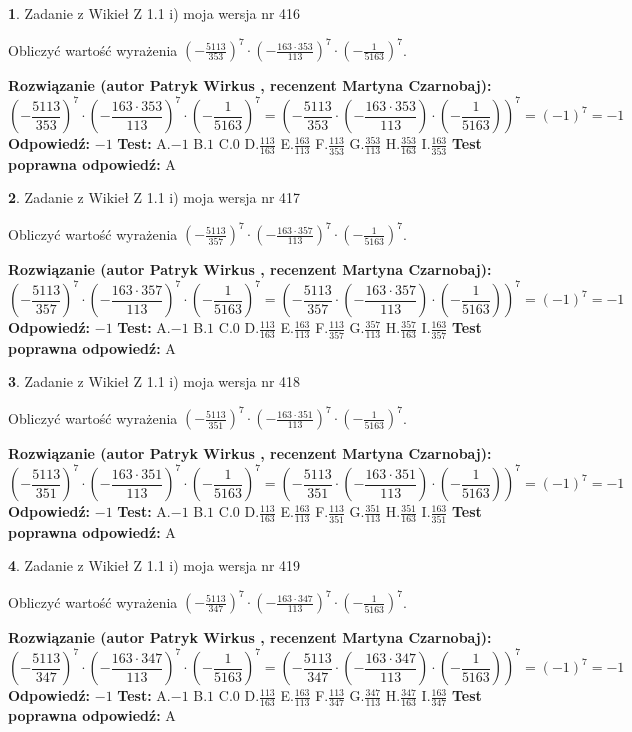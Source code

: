 \documentclass[12pt, a4paper]{article}
\theoremstyle{definition} %
\newtheorem{zad}{}
\newcommand{\zadStart}[1]{\begin{zad}#1\newline}
\newcommand{\zadStop}{\end{zad}}
\newcommand{\rozwStart}[2]{\noindent \textbf{Rozwiązanie (autor #1 , recenzent #2): }\newline}
\newcommand{\rozwStop}{\newline}
\newcommand{\odpStart}{\noindent \textbf{Odpowiedź:}\newline}
\newcommand{\odpStop}{\newline}
\newcommand{\testStart}{\noindent \textbf{Test:}\newline}
\newcommand{\testStop}{\newline}
\newcommand{\kluczStart}{\noindent \textbf{Test poprawna odpowiedź:}\newline}
\newcommand{\kluczStop}{\newline}
\begin{document}
\zadStart{Zadanie z Wikieł Z 1.1 i) moja wersja nr 416}

Obliczyć wartość wyrażenia $(-\frac{5113}{353})^{7} \cdot (-\frac{163 \cdot 353}{113})^{7} \cdot (-\frac{1}{5163})^{7}$.
\zadStop
\rozwStart{Patryk Wirkus}{Martyna Czarnobaj}
$$(-\frac{5113}{353})^{7} \cdot (-\frac{163 \cdot 353}{113})^{7} \cdot (-\frac{1}{5163})^{7} = (-\frac{5113}{353} \cdot (-\frac{163 \cdot 353}{113}) \cdot (-\frac{1}{5163}))^{7} = (-1)^{7} = -1$$
\rozwStop
\odpStart
$-1$
\odpStop
\testStart
A.$-1$ B.$1$ C.$0$ D.$\frac{113}{163}$ E.$\frac{163}{113}$
F.$\frac{113}{353}$ G.$\frac{353}{113}$
H.$\frac{353}{163}$
I.$\frac{163}{353}$
\testStop
\kluczStart
A
\kluczStop



\zadStart{Zadanie z Wikieł Z 1.1 i) moja wersja nr 417}

Obliczyć wartość wyrażenia $(-\frac{5113}{357})^{7} \cdot (-\frac{163 \cdot 357}{113})^{7} \cdot (-\frac{1}{5163})^{7}$.
\zadStop
\rozwStart{Patryk Wirkus}{Martyna Czarnobaj}
$$(-\frac{5113}{357})^{7} \cdot (-\frac{163 \cdot 357}{113})^{7} \cdot (-\frac{1}{5163})^{7} = (-\frac{5113}{357} \cdot (-\frac{163 \cdot 357}{113}) \cdot (-\frac{1}{5163}))^{7} = (-1)^{7} = -1$$
\rozwStop
\odpStart
$-1$
\odpStop
\testStart
A.$-1$ B.$1$ C.$0$ D.$\frac{113}{163}$ E.$\frac{163}{113}$
F.$\frac{113}{357}$ G.$\frac{357}{113}$
H.$\frac{357}{163}$
I.$\frac{163}{357}$
\testStop
\kluczStart
A
\kluczStop



\zadStart{Zadanie z Wikieł Z 1.1 i) moja wersja nr 418}

Obliczyć wartość wyrażenia $(-\frac{5113}{351})^{7} \cdot (-\frac{163 \cdot 351}{113})^{7} \cdot (-\frac{1}{5163})^{7}$.
\zadStop
\rozwStart{Patryk Wirkus}{Martyna Czarnobaj}
$$(-\frac{5113}{351})^{7} \cdot (-\frac{163 \cdot 351}{113})^{7} \cdot (-\frac{1}{5163})^{7} = (-\frac{5113}{351} \cdot (-\frac{163 \cdot 351}{113}) \cdot (-\frac{1}{5163}))^{7} = (-1)^{7} = -1$$
\rozwStop
\odpStart
$-1$
\odpStop
\testStart
A.$-1$ B.$1$ C.$0$ D.$\frac{113}{163}$ E.$\frac{163}{113}$
F.$\frac{113}{351}$ G.$\frac{351}{113}$
H.$\frac{351}{163}$
I.$\frac{163}{351}$
\testStop
\kluczStart
A
\kluczStop



\zadStart{Zadanie z Wikieł Z 1.1 i) moja wersja nr 419}

Obliczyć wartość wyrażenia $(-\frac{5113}{347})^{7} \cdot (-\frac{163 \cdot 347}{113})^{7} \cdot (-\frac{1}{5163})^{7}$.
\zadStop
\rozwStart{Patryk Wirkus}{Martyna Czarnobaj}
$$(-\frac{5113}{347})^{7} \cdot (-\frac{163 \cdot 347}{113})^{7} \cdot (-\frac{1}{5163})^{7} = (-\frac{5113}{347} \cdot (-\frac{163 \cdot 347}{113}) \cdot (-\frac{1}{5163}))^{7} = (-1)^{7} = -1$$
\rozwStop
\odpStart
$-1$
\odpStop
\testStart
A.$-1$ B.$1$ C.$0$ D.$\frac{113}{163}$ E.$\frac{163}{113}$
F.$\frac{113}{347}$ G.$\frac{347}{113}$
H.$\frac{347}{163}$
I.$\frac{163}{347}$
\testStop
\kluczStart
A
\kluczStop
\end{document}
